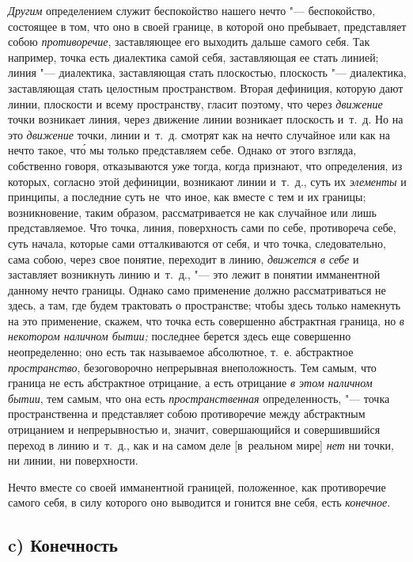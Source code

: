 {\em Другим} определением служит беспокойство нашего
нечто "--- беспокойство, состоящее в том, что оно в своей границе, в которой
оно пребывает, представляет собою {\em противоречие},
заставляющее его выходить дальше самого себя. Так например, точка есть
диалектика самой себя, заставляющая ее стать линией; линия "--- диалектика,
заставляющая стать плоскостью, плоскость "--- диалектика, заставляющая стать
целостным пространством. Вторая дефиниция, которую дают линии, плоскости и
всему пространству, гласит поэтому, что через
{\em движение} точки возникает линия, через движение
линии возникает плоскость и~т.~д. Но на это
{\em движение} точки, линии и~т.~д. смотрят как на
нечто случайное или как на нечто такое, чт\'{о} мы только представляем себе.
Однако от этого взгляда, собственно говоря, отказываются уже тогда, когда
признают, что определения, из которых, согласно этой дефиниции, возникают
линии и~т.~д., суть их {\em элементы} и принципы, а
последние суть не~что иное, как вместе с тем и их границы; возникновение,
таким образом, рассматривается не как случайное или лишь представляемое.
Что точка, линия, поверхность сами по себе, противореча себе, суть начала,
которые сами отталкиваются от себя, и что точка, следовательно, сама собою,
через свое понятие, переходит в линию, {\em движется в
себе} и заставляет возникнуть линию и~т.~д., "--- это лежит в понятии
имманентной данному нечто границы. Однако само применение должно
рассматриваться не здесь, а там, где будем трактовать о пространстве; чтобы
здесь только намекнуть на это применение, скажем, что точка есть совершенно
абстрактная граница, но {\em в некотором наличном
бытии;} последнее берется здесь еще совершенно неопределенно; оно есть так
называемое абсолютное, т.~е. абстрактное
{\em пространство}, безоговорочно непрерывная
внеположность. Тем самым, что граница не есть абстрактное отрицание, а есть
отрицание {\em в этом наличном бытии}, тем самым, что
она есть {\em пространственная} определенность, "--- точка
пространственна и представляет собою противоречие между абстрактным
отрицанием и непрерывностью и, значит, совершающийся и совершившийся
переход в линию и~т.~д., как и на самом деле [в~реальном мире]
{\em нет} ни точки, ни линии, ни поверхности.

Нечто вместе со своей имманентной границей, положенное, как противоречие
самого себя, в силу которого оно выводится и гонится вне себя, есть
{\em конечное}.

\subsection[c) Конечность]{c) Конечность}


